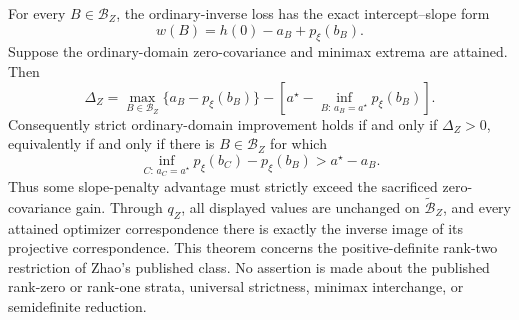 For every \(B\in\mathcal B_Z\), the ordinary-inverse loss has the exact intercept--slope form
\[
w(B)=h(0)-a_B+p_\xi(b_B).
\]
Suppose the ordinary-domain zero-covariance and minimax extrema are attained.  Then
\[
\Delta_Z=
\max_{B\in\mathcal B_Z}\{a_B-p_\xi(b_B)\}
-\left[a^\star-\inf_{B:\,a_B=a^\star}p_\xi(b_B)\right].
\]
Consequently strict ordinary-domain improvement holds if and only if \(\Delta_Z>0\), equivalently if and only if there is \(B\in\mathcal B_Z\) for which
\[
\inf_{C:\,a_C=a^\star}p_\xi(b_C)-p_\xi(b_B)
>a^\star-a_B.
\]
Thus some slope-penalty advantage must strictly exceed the sacrificed zero-covariance gain.  Through \(q_Z\), all displayed values are unchanged on \(\widetilde{\mathcal B}_Z\), and every attained optimizer correspondence there is exactly the inverse image of its projective correspondence.  This theorem concerns the positive-definite rank-two restriction of Zhao's published class.  No assertion is made about the published rank-zero or rank-one strata, universal strictness, minimax interchange, or semidefinite reduction.